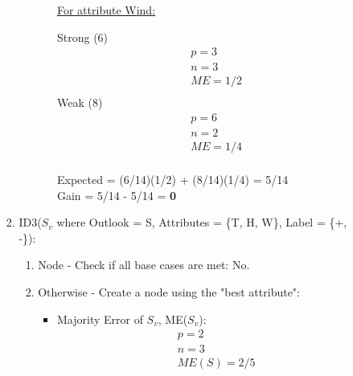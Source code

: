 \documentclass[8pt, fullpage,letterpaper]{article}
\begin{document}
\begin{enumerate}
\begin{enumerate}
\begin{enumerate}
\begin{enumerate}
\begin{itemize}
						\underline {For attribute Wind:} 
							\vspace{-5pt}
							\begin{multicols}{2}
								Strong (6)
			 						\begin{align*}
									    	& p = 3\\
										& n = 3 \\
									    	& ME = 1/2\\
								      \end{align*}
								Weak (8)
			 						\begin{align*}
									    	& p = 6\\
										& n = 2 \\
									    	& ME = 1/4\\
								      \end{align*}
							\end{multicols}
							\vspace{-20pt}
							Expected = (6/14)(1/2) + (8/14)(1/4) = 5/14\\
							Gain = 5/14 - 5/14 = {\bf 0}\\

					\centerline{}	
				\end{itemize}	
			\end{enumerate}

	 	\item ID3($S_v$ where Outlook = S, Attributes = \{T, H, W\}, Label = \{+, -\}): 
			\begin{enumerate}
			\item Node - Check if all base cases are met: {\color{red} No}.
			\item Otherwise - Create a node using the "best attribute":
				\begin{itemize}
					\item Majority Error of $S_v$, ME($S_v$):
						\begin{align*}
						    	& p = 2\\
							& n = 3 \\
						    	& ME(S) = 2/5
					      \end{align*}


\end{itemize}
\end{enumerate}
\end{enumerate}
\end{enumerate}
\end{enumerate}
\end{document}
